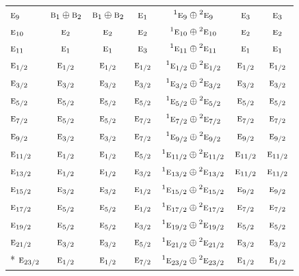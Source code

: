 \documentclass[10pt,a4paper]{article}
\numberwithin{equation}{section}
\newcommand{\irr}[1]{\text{\normalfont\scshape #1}}
\newcommand{\conjpair}[1]{{}^{#1}}
\begin{document}
{\begin{longtable}{@{}lcccccc@{}}
$\irr{e}_{9}$ & $\irr{b}_{1}\oplus \irr{b}_{2}$ & $\irr{b}_{1}\oplus \irr{b}_{2}$ & $\irr{e}_{1}$ & $\conjpair{1}\irr{e}_{9}\oplus \conjpair{2}\irr{e}_{9}$ & $\irr{e}_{3}$ & $\irr{e}_{3}$\\
$\irr{e}_{10}$ & $\irr{e}_{2}$ & $\irr{e}_{2}$ & $\irr{e}_{2}$ & $\conjpair{1}\irr{e}_{10}\oplus \conjpair{2}\irr{e}_{10}$ & $\irr{e}_{2}$ & $\irr{e}_{2}$\\
$\irr{e}_{11}$ & $\irr{e}_{1}$ & $\irr{e}_{1}$ & $\irr{e}_{3}$ & $\conjpair{1}\irr{e}_{11}\oplus \conjpair{2}\irr{e}_{11}$ & $\irr{e}_{1}$ & $\irr{e}_{1}$\\
$\irr{e}_{1/2}$ & $\irr{e}_{1/2}$ & $\irr{e}_{1/2}$ & $\irr{e}_{1/2}$ & $\conjpair{1}\irr{e}_{1/2}\oplus \conjpair{2}\irr{e}_{1/2}$ & $\irr{e}_{1/2}$ & $\irr{e}_{1/2}$\\
$\irr{e}_{3/2}$ & $\irr{e}_{3/2}$ & $\irr{e}_{3/2}$ & $\irr{e}_{3/2}$ & $\conjpair{1}\irr{e}_{3/2}\oplus \conjpair{2}\irr{e}_{3/2}$ & $\irr{e}_{3/2}$ & $\irr{e}_{3/2}$\\
$\irr{e}_{5/2}$ & $\irr{e}_{5/2}$ & $\irr{e}_{5/2}$ & $\irr{e}_{5/2}$ & $\conjpair{1}\irr{e}_{5/2}\oplus \conjpair{2}\irr{e}_{5/2}$ & $\irr{e}_{5/2}$ & $\irr{e}_{5/2}$\\
$\irr{e}_{7/2}$ & $\irr{e}_{5/2}$ & $\irr{e}_{5/2}$ & $\irr{e}_{7/2}$ & $\conjpair{1}\irr{e}_{7/2}\oplus \conjpair{2}\irr{e}_{7/2}$ & $\irr{e}_{7/2}$ & $\irr{e}_{7/2}$\\
$\irr{e}_{9/2}$ & $\irr{e}_{3/2}$ & $\irr{e}_{3/2}$ & $\irr{e}_{7/2}$ & $\conjpair{1}\irr{e}_{9/2}\oplus \conjpair{2}\irr{e}_{9/2}$ & $\irr{e}_{9/2}$ & $\irr{e}_{9/2}$\\
$\irr{e}_{11/2}$ & $\irr{e}_{1/2}$ & $\irr{e}_{1/2}$ & $\irr{e}_{5/2}$ & $\conjpair{1}\irr{e}_{11/2}\oplus \conjpair{2}\irr{e}_{11/2}$ & $\irr{e}_{11/2}$ & $\irr{e}_{11/2}$\\
$\irr{e}_{13/2}$ & $\irr{e}_{1/2}$ & $\irr{e}_{1/2}$ & $\irr{e}_{3/2}$ & $\conjpair{1}\irr{e}_{13/2}\oplus \conjpair{2}\irr{e}_{13/2}$ & $\irr{e}_{11/2}$ & $\irr{e}_{11/2}$\\
$\irr{e}_{15/2}$ & $\irr{e}_{3/2}$ & $\irr{e}_{3/2}$ & $\irr{e}_{1/2}$ & $\conjpair{1}\irr{e}_{15/2}\oplus \conjpair{2}\irr{e}_{15/2}$ & $\irr{e}_{9/2}$ & $\irr{e}_{9/2}$\\
$\irr{e}_{17/2}$ & $\irr{e}_{5/2}$ & $\irr{e}_{5/2}$ & $\irr{e}_{1/2}$ & $\conjpair{1}\irr{e}_{17/2}\oplus \conjpair{2}\irr{e}_{17/2}$ & $\irr{e}_{7/2}$ & $\irr{e}_{7/2}$\\
$\irr{e}_{19/2}$ & $\irr{e}_{5/2}$ & $\irr{e}_{5/2}$ & $\irr{e}_{3/2}$ & $\conjpair{1}\irr{e}_{19/2}\oplus \conjpair{2}\irr{e}_{19/2}$ & $\irr{e}_{5/2}$ & $\irr{e}_{5/2}$\\
$\irr{e}_{21/2}$ & $\irr{e}_{3/2}$ & $\irr{e}_{3/2}$ & $\irr{e}_{5/2}$ & $\conjpair{1}\irr{e}_{21/2}\oplus \conjpair{2}\irr{e}_{21/2}$ & $\irr{e}_{3/2}$ & $\irr{e}_{3/2}$\\*
$\irr{e}_{23/2}$ & $\irr{e}_{1/2}$ & $\irr{e}_{1/2}$ & $\irr{e}_{7/2}$ & $\conjpair{1}\irr{e}_{23/2}\oplus \conjpair{2}\irr{e}_{23/2}$ & $\irr{e}_{1/2}$ & $\irr{e}_{1/2}$\\
\bottomrule\end{longtable}}
\end{document}
